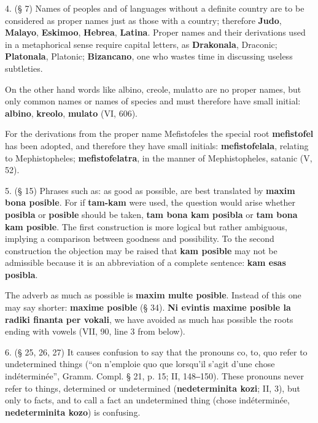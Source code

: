 4. (§ 7) Names of peoples and of languages without a definite country are to be considered as proper names just as those with a country; therefore \textbf{Judo}, \textbf{Malayo}, \textbf{Eskimoo}, \textbf{Hebrea}, \textbf{Latina}. Proper names and their derivations used in a metaphorical sense require capital letters, as \textbf{Drakonala}, Draconic; \textbf{Platonala}, Platonic; \textbf{Bizancano}, one who wastes time in discussing useless subtleties.

On the other hand words like albino, creole, mulatto are no proper names, but only common names or names of species and must therefore have small initial: \textbf{albino}, \textbf{kreolo}, \textbf{mulato} (VI, 606).

For the derivations from the proper name Mefistofeles the special root \textbf{mefistofel} has been adopted, and therefore they have small initials: \textbf{mefistofelala}, relating to Mephistopheles; \textbf{mefistofelatra}, in the manner of Mephistopheles, satanic (V, 52).

5. (§ 15) Phrases such as: as good as possible, are best translated by \textbf{maxim bona posible}. For if \textbf{tam-kam} were used, the question would arise whether \textbf{posibla} or \textbf{posible} should be taken, \textbf{tam bona kam posibla} or \textbf{tam bona kam posible}. The first construction is more logical but rather ambiguous, implying a comparison between goodness and possibility. To the second construction the objection may be raised that \textbf{kam posible} may not be admissible because it is an abbreviation of a complete sentence: \textbf{kam esas posibla}.

The adverb as much as possible is \textbf{maxim multe posible}. Instead of this one may say shorter: \textbf{maxime posible} (§ 34). \textbf{Ni evintis maxime posible la radiki finanta per vokali}, we have avoided as much has possible the roots ending with vowels (VII, 90, line 3 from below).

6. (§ 25, 26, 27) It causes confusion to say that the pronouns co, to, quo refer to undetermined things (``on n'emploie quo que lorsqu'il s'agit d'une chose indéterminée'', Gramm. Compl. § 21, p. 15; II, 148‒150). These pronouns never refer to things, determined or undetermined (\textbf{nedeterminita kozi}; II, 3), but only to facts, and to call a fact an undetermined thing (chose indéterminée, \textbf{nedeterminita kozo}) is confusing.

